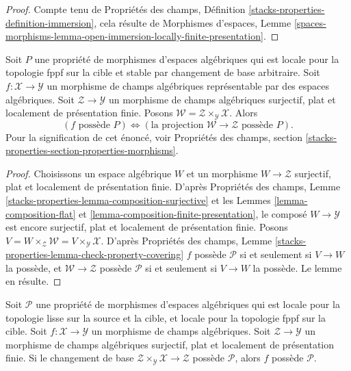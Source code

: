 \begin{proof}
Compte tenu de Propriétés des champs, Définition
\ref{stacks-properties-definition-immersion}, cela résulte de Morphismes
d'espaces, Lemme
\ref{spaces-morphisms-lemma-open-immersion-locally-finite-presentation}.
\end{proof}

\begin{lemma}
\label{lemma-check-property-after-fppf-base-change}
Soit $P$ une propriété de morphismes d'espaces algébriques qui est locale pour
la topologie fppf sur la cible et stable par changement de base arbitraire.
Soit $f : \mathcal{X} \to \mathcal{Y}$ un morphisme de champs algébriques
représentable par des espaces algébriques. Soit
$\mathcal{Z} \to \mathcal{Y}$ un morphisme de champs algébriques surjectif,
plat et localement de présentation finie. Posons
$\mathcal{W} = \mathcal{Z} \times_\mathcal{Y} \mathcal{X}$. Alors
$$
(f\text{ possède }P) \Leftrightarrow
(\text{la projection }\mathcal{W} \to \mathcal{Z}\text{ possède }P).
$$
Pour la signification de cet énoncé, voir Propriétés des champs, section
\ref{stacks-properties-section-properties-morphisms}.
\end{lemma}

\begin{proof}
Choisissons un espace algébrique $W$ et un morphisme
$W \to \mathcal{Z}$ surjectif, plat et localement de présentation finie.
D'après Propriétés des champs, Lemme
\ref{stacks-properties-lemma-composition-surjective}
et les Lemmes \ref{lemma-composition-flat} et
\ref{lemma-composition-finite-presentation}, le composé
$W \to \mathcal{Y}$ est encore surjectif, plat et localement de présentation
finie. Posons
$V = W \times_\mathcal{Z} \mathcal{W} = V \times_\mathcal{Y} \mathcal{X}$.
D'après Propriétés des champs, Lemme
\ref{stacks-properties-lemma-check-property-covering}
$f$ possède $\mathcal{P}$ si et seulement si $V \to W$ la possède, et
$\mathcal{W} \to \mathcal{Z}$ possède $\mathcal{P}$ si et seulement si $V \to W$
la possède. Le lemme en résulte.
\end{proof}

\begin{lemma}
\label{lemma-descent-property}
Soit $\mathcal{P}$ une propriété de morphismes d'espaces algébriques qui est
locale pour la topologie lisse sur la source et la cible, et locale pour la
topologie fppf sur la cible. Soit
$f : \mathcal{X} \to \mathcal{Y}$ un morphisme de champs algébriques. Soit
$\mathcal{Z} \to \mathcal{Y}$ un morphisme de champs algébriques surjectif,
plat et localement de présentation finie. Si le changement de base
$\mathcal{Z} \times_\mathcal{Y} \mathcal{X} \to \mathcal{Z}$
possède $\mathcal{P}$, alors $f$ possède $\mathcal{P}$.
\end{lemma}

